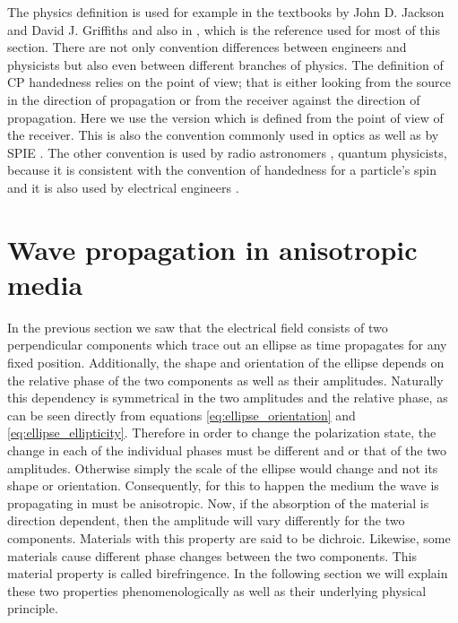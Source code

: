 The physics definition is used for example in the textbooks by John D. Jackson \cite{Jackson1998ClassicalEdition} and David J. Griffiths \cite{Griffiths2017IntroductionElectrodynamics} and also in \cite{Collett2009FieldPolarization}, which is the reference used for most of this section.
There are not only convention differences between engineers and physicists but also even between different branches of physics. The definition of CP handedness relies on the point of view; that is either looking from the source in the direction of propagation or from the receiver against the direction of propagation. Here we use the version which is defined from the point of view of the receiver. This is also the convention commonly used in optics \cite{Bass2016HandbookOptics, M.LandiDeglInnocenti2004PolarizationLines} as well as by SPIE \cite{Collett2009FieldPolarization}.
The other convention is used by radio astronomers \cite{1973CommissionAstronomie}, quantum physicists, because it is consistent with the convention of handedness for a particle's spin and it is also used by electrical engineers \cite{Orfanidis2004ElectromagneticAntennas}.

\section{Wave propagation in anisotropic media}
In the previous section we saw that the electrical field consists of two perpendicular components which trace out an ellipse as time propagates for any fixed position. Additionally, the shape and orientation of the ellipse depends on the relative phase of the two components as well as their amplitudes. Naturally this dependency is symmetrical in the two amplitudes and the relative phase, as can be seen directly from equations \ref{eq:ellipse_orientation} and \ref{eq:ellipse_ellipticity}. Therefore in order to change the polarization state, the change in each of the individual phases must be different and or that of the two amplitudes. Otherwise simply the scale of the ellipse would change and not its shape or orientation. Consequently, for this to happen the medium the wave is propagating in must be anisotropic. Now, if the absorption of the material is direction dependent, then the amplitude will vary differently for the two components. Materials with this property are said to be dichroic. Likewise, some materials cause different phase changes between the two components. This material property is called birefringence. In the following section we will explain these two properties phenomenologically as well as their underlying physical principle.

